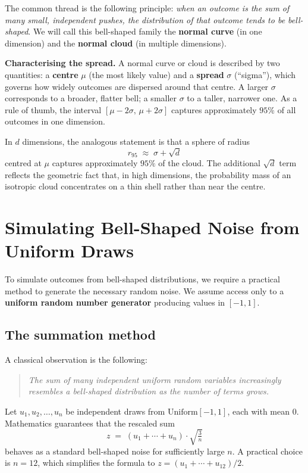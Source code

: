 \documentclass[11pt]{article}
\begin{document}
\noindent
The common thread is the following principle: \emph{when an outcome is the sum of many small, independent pushes, the distribution of that outcome tends to be bell-shaped}.
We will call this bell-shaped family the \textbf{normal curve} (in one dimension) and the \textbf{normal cloud} (in multiple dimensions).

\medskip\noindent
\textbf{Characterising the spread.}
A normal curve or cloud is described by two quantities: a \textbf{centre} $\mu$ (the most likely value) and a \textbf{spread} $\sigma$ (``sigma''), which governs how widely outcomes are dispersed around that centre.
A larger $\sigma$ corresponds to a broader, flatter bell; a smaller $\sigma$ to a taller, narrower one.
As a rule of thumb, the interval $[\mu - 2\sigma,\, \mu + 2\sigma]$ captures approximately $95\%$ of all outcomes in one dimension.

In $d$ dimensions, the analogous statement is that a sphere of radius
\[
  r_{95} \;\approx\; \sigma + \sqrt{d}
\]
centred at $\mu$ captures approximately $95\%$ of the cloud.
The additional $\sqrt{d}$ term reflects the geometric fact that, in high dimensions, the probability mass of an isotropic cloud concentrates on a thin shell rather than near the centre.

\section{Simulating Bell-Shaped Noise from Uniform Draws}

To simulate outcomes from bell-shaped distributions, we require a practical method to generate the necessary random noise.
We assume access only to a \textbf{uniform random number generator} producing values in $[-1,1]$.

\subsection*{The summation method}

A classical observation is the following:
\begin{quote}
  \emph{The sum of many independent uniform random variables increasingly resembles a bell-shaped distribution as the number of terms grows.}
\end{quote}

Let $u_1, u_2, \ldots, u_n$ be independent draws from $\mathrm{Uniform}[-1,1]$, each with mean $0$.
Mathematics guarantees that the rescaled sum
\[
  z \;=\; (u_1 + \cdots + u_n) \cdot \sqrt{\tfrac{3}{n}}
\]
behaves as a standard bell-shaped noise for sufficiently large $n$.
A practical choice is $n = 12$, which simplifies the formula to $z = (u_1 + \cdots + u_{12})/2$.
\end{document}
